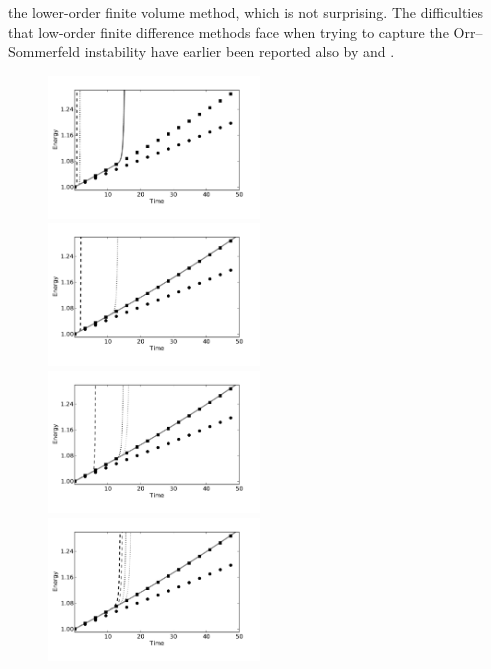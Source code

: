 the lower-order finite volume method, which is not surprising. The
difficulties that low-order finite difference methods face when trying
to capture the Orr--Sommerfeld instability have earlier been reported
also by \citet{MalikZangHussaini1984} and
\citet{CanutoHussainiQuarteroniEtAl2007}.
\begin{figure}
\includegraphics[width=0.5\textwidth]{chapters/mortensen/pdf/OS_energy_cfl_0_1_model_1.pdf}
\includegraphics[width=0.5\textwidth]{chapters/mortensen/pdf/OS_energy_cfl_0_1_model_0.pdf}
\includegraphics[width=0.5\textwidth]{chapters/mortensen/pdf/OS_energy_cfl_0_05_model_1.pdf}
\includegraphics[width=0.5\textwidth]{chapters/mortensen/pdf/OS_energy_cfl_0_05_model_0.pdf}

\end{figure}
